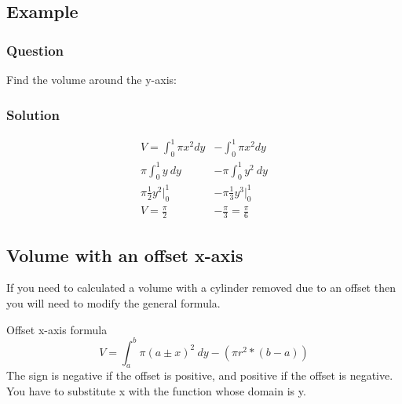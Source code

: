 \documentclass[letterpaper,10pt,twoside,twocolumn,openany]{book}
\begin{document}
\subsection{Example}
\subsubsection*{Question}
Find the volume around the y-axis:
\subsubsection*{Solution}
\begin{align*}
    V = \int_0^1 \pi x^2 dy &- \int_0^1 \pi x^2 dy\\
    \pi \int_0^1 y\ dy &- \pi \int_0^1 y^2\ dy\\
    \pi \frac{1}{2}y^2\Big|_0^1 &- \pi \frac{1}{3}y^3 \Big|_0^1\\
    V = \frac{\pi}{2} &- \frac{\pi}{3} = \frac{\pi}{6} 
\end{align*}
\newpage
\subsection{Volume with an offset x-axis}
If you need to calculated a volume with a cylinder removed due to an offset then you will need to modify the general formula.
\begin{paperbox}[]{Offset x-axis formula}
    \begin{equation}
        V = \int_a^b \pi (a \pm x)^2\ dy - (\pi r^2 * (b-a))
    \end{equation}
    The sign is negative if the offset is positive, and positive if the offset is negative.
    You have to substitute x with the function whose domain is y.
\end{paperbox}
\end{document}
